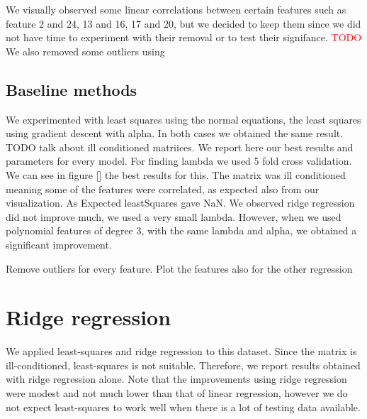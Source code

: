 \documentclass{article} %
\begin{document}

We visually observed some linear correlations between certain features such as feature 2 and 24, 13 and 16, 17 and 20, but we decided to keep them since we did not have time to experiment with their removal or to test their signifance.
\textcolor{red}{TODO} We also removed some outliers using

\subsection{Baseline methods}
 We experimented with least squares using the normal equations, the least squares using gradient descent with alpha.  In both cases we obtained the same result. TODO talk about ill conditioned matriices.
 We report here our best results and parameters for every model. 
 For finding lambda we used 5 fold cross validation. We can see in figure [] the best results for this.
 The matrix was ill conditioned meaning some of the features were correlated, as expected also from our visualization. As Expected leastSquares gave NaN. We observed ridge regression did not improve much, we used a very small lambda. However, when we used polynomial features of degree 3,  with the same lambda and alpha, we obtained a significant improvement.
 
 Remove outliers for every feature. Plot the features also for the other regression
  
\section{Ridge regression}
We applied least-squares and ridge regression to this dataset. Since the matrix is ill-conditioned, least-squares is not suitable. Therefore, we report results obtained with ridge regression alone. Note that the improvements using ridge regression were modest and not much lower than that of linear regression, however we do not expect least-squares to work well when there is a lot of testing data available. 
\end{document}
